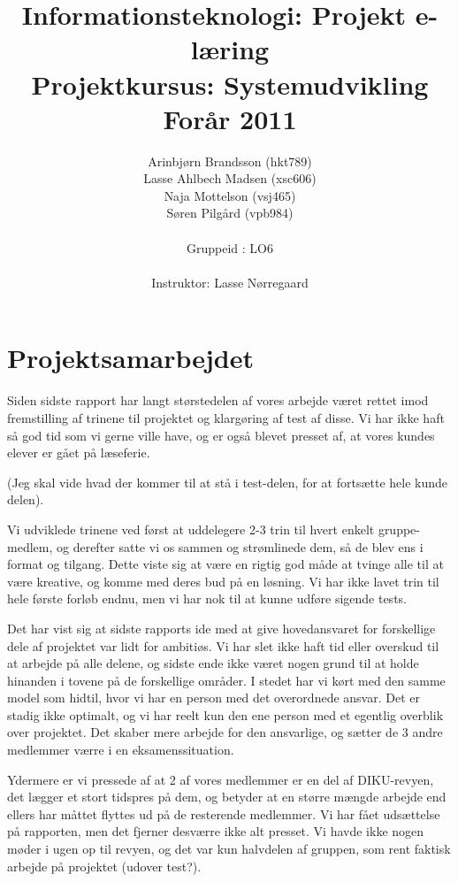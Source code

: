 \documentclass[10pt,a4paper,danish]{article}
\title{Informationsteknologi: Projekt e-læring \\ Projektkursus: Systemudvikling \\Forår 2011}
\author{Arinbjørn Brandsson (hkt789)\\Lasse Ahlbech Madsen (xsc606)\\Naja Mottelson (vsj465)\\Søren Pilgård (vpb984)\\
\\
Gruppeid : LO6\\
\\Instruktor: Lasse Nørregaard}
\begin{document}
\maketitle
\newpage

\tableofcontents
\newpage


\section{Projektsamarbejdet}

Siden sidste rapport har langt størstedelen af vores arbejde været rettet imod
fremstilling af trinene til projektet og klargøring af test af disse. Vi har
ikke haft så god tid som vi gerne ville have, og er også blevet presset af, at
vores kundes elever er gået på læseferie. 

(Jeg skal vide hvad der kommer til at stå i test-delen, for at fortsætte hele kunde delen).

Vi udviklede trinene ved først at uddelegere 2-3 trin til hvert enkelt gruppe-
medlem, og derefter satte vi os sammen og strømlinede dem, så de blev ens i
format og tilgang. Dette viste sig at være en rigtig god måde at tvinge alle
til at være kreative, og komme med deres bud på en løsning. Vi har ikke lavet
trin til hele første forløb endnu, men vi har nok til at kunne udføre sigende
tests.

Det har vist sig at sidste rapports ide med at give hovedansvaret for
forskellige dele af projektet var lidt for ambitiøs. Vi har slet ikke haft tid
eller overskud til at arbejde på alle delene, og sidste ende ikke været nogen
grund til at holde hinanden i tovene på de forskellige områder. I stedet har vi
kørt med den samme model som hidtil, hvor vi har en person med det overordnede
ansvar. Det er stadig ikke optimalt, og vi har reelt kun den ene person med et
egentlig overblik over projektet. Det skaber mere arbejde for den ansvarlige,
og sætter de 3 andre medlemmer værre i en eksamenssituation.

Ydermere er vi pressede af at 2 af vores medlemmer er en del af DIKU-revyen,
det lægger et stort tidspres på dem, og betyder at en større mængde arbejde
end ellers har måttet flyttes ud på de resterende medlemmer. Vi har fået
udsættelse på rapporten, men det fjerner desværre ikke alt presset. Vi havde
ikke nogen møder i ugen op til revyen, og det var kun halvdelen af gruppen,
som rent faktisk arbejde på projektet (udover test?).
\end{document}
